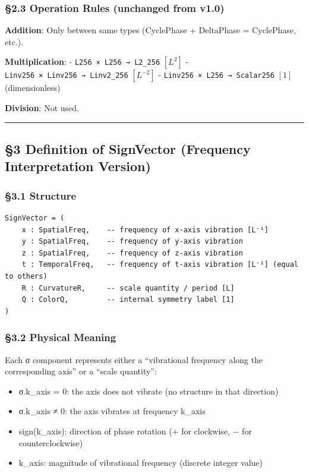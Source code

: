\documentclass[a4paper,11pt]{article}
\providecommand{\tightlist}{\setlength{\itemsep}{0pt}\setlength{\parskip}{0pt}}
\begin{document}
\subsubsection{§2.3 Operation Rules (unchanged from
v1.0)}\label{operation-rules-unchanged-from-v1.0}

\textbf{Addition}: Only between same types (CyclePhase + DeltaPhase =
CyclePhase, etc.).

\textbf{Multiplication}: - \texttt{L256\ ×\ L256\ →\ L2\_256} \([L^2]\)
- \texttt{Linv256\ ×\ Linv256\ →\ Linv2\_256} \([L^{-2}]\) -
\texttt{Linv256\ ×\ L256\ →\ Scalar256} \([1]\) (dimensionless)

\textbf{Division}: Not used.

\begin{center}\rule{0.5\linewidth}{0.5pt}\end{center}

\subsection{§3 Definition of SignVector (Frequency Interpretation
Version)}\label{definition-of-signvector-frequency-interpretation-version}

\subsubsection{§3.1 Structure}\label{structure}

\begin{verbatim}
SignVector = (
    x : SpatialFreq,    -- frequency of x-axis vibration [L⁻¹]
    y : SpatialFreq,    -- frequency of y-axis vibration
    z : SpatialFreq,    -- frequency of z-axis vibration
    t : TemporalFreq,   -- frequency of t-axis vibration [L⁻¹] (equal to others)
    R : CurvatureR,     -- scale quantity / period [L]
    Q : ColorQ,         -- internal symmetry label [1]
)
\end{verbatim}

\subsubsection{§3.2 Physical Meaning}\label{physical-meaning}

Each σ component represents either a ``vibrational frequency along the
corresponding axis'' or a ``scale quantity'':

\begin{itemize}
\tightlist
\item
  σ.k\_axis = 0: the axis does not vibrate (no structure in that
  direction)
\item
  σ.k\_axis ≠ 0: the axis vibrates at frequency
  \textbar k\_axis\textbar{}
\item
  sign(k\_axis): direction of phase rotation (+ for clockwise, − for
  counterclockwise)
\item
  \textbar k\_axis\textbar: magnitude of vibrational frequency (discrete
  integer value)
\end{itemize}
\end{document}
